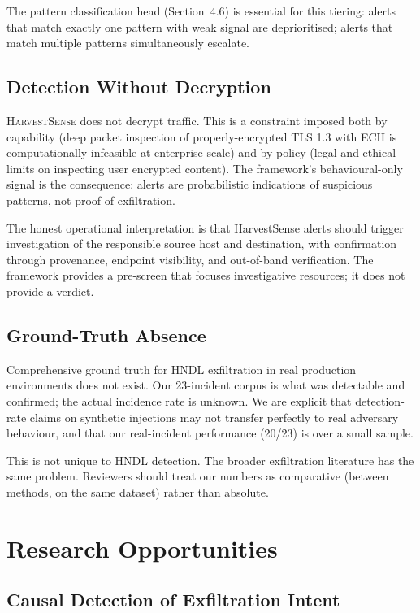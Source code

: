 \documentclass[sigconf,nonacm]{acmart}
\begin{document}
The pattern classification head (Section~4.6) is essential for this
tiering: alerts that match exactly one pattern with weak signal are
deprioritised; alerts that match multiple patterns simultaneously
escalate.

\subsection{Detection Without Decryption}

\textsc{HarvestSense} does not decrypt traffic. This is a constraint
imposed both by capability (deep packet inspection of properly-encrypted
TLS 1.3 with ECH is computationally infeasible at enterprise scale)
and by policy (legal and ethical limits on inspecting user encrypted
content). The framework's behavioural-only signal is the consequence:
alerts are probabilistic indications of suspicious patterns, not proof
of exfiltration.

The honest operational interpretation is that HarvestSense alerts
should trigger investigation of the responsible source host and
destination, with confirmation through provenance, endpoint
visibility, and out-of-band verification. The framework provides a
pre-screen that focuses investigative resources; it does not provide
a verdict.

\subsection{Ground-Truth Absence}

Comprehensive ground truth for HNDL exfiltration in real production
environments does not exist. Our 23-incident corpus is what was
detectable and confirmed; the actual incidence rate is unknown. We
are explicit that detection-rate claims on synthetic injections may
not transfer perfectly to real adversary behaviour, and that our
real-incident performance (20/23) is over a small sample.

This is not unique to HNDL detection. The broader exfiltration
literature has the same problem. Reviewers should treat our numbers
as comparative (between methods, on the same dataset) rather than
absolute.

\section{Research Opportunities}

\subsection{Causal Detection of Exfiltration Intent}
\end{document}
